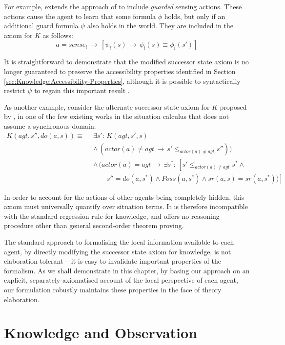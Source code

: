 For example, \citet{Petrick06thesis} extends the approach of \citep{scherl03sc_knowledge}
to include \emph{guarded} sensing actions. These actions cause the
agent to learn that some formula $\phi$ holds, but only if an additional
guard formula $\psi$ also holds in the world. They are included in
the axiom for $K$ as follows:\[
a=sense_{i}\,\rightarrow\,\left[\psi_{i}(s)\,\rightarrow\,\phi_{i}(s)\equiv\phi_{i}(s')\right]\]


It is straightforward to demonstrate that the modified successor state
axiom is no longer guaranteed to preserve the accessibility properties
identified in Section \eqref{sec:Knowledge:Accessibility-Properties},
although it is possible to syntactically restrict $\psi$ to regain
this important result \citep{Petrick06thesis}.

As another example, consider the alternate successor state axiom for
$K$ proposed by \citet{Lesperance99sitcalc_approach}, in one of
the few existing works in the situation calculus that does not assume
a synchronous domain:\begin{align*}
K(agt,s'',do(a,s))\equiv\,\,\, & \exists s':\, K(agt,s',s)\\
 & \wedge\,(actor(a)\neq agt\,\rightarrow\, s'\leq_{actor(a)\neq agt}s''))\\
 & \wedge\,(actor(a)=agt\,\rightarrow\,\exists s^{*}:\,\left[s'\leq_{actor(a)\neq agt}s^{*}\wedge\right.\\
 & \,\,\,\,\,\,\,\,\,\,\,\,\left.s''=do(a,s^{*})\wedge Poss(a,s^{*})\wedge sr(a,s)=sr(a,s^{*}))\right]\end{align*}


In order to account for the actions of other agents being completely
hidden, this axiom must universally quantify over situation terms.
It is therefore incompatible with the standard regression rule for
knowledge, and \citep{Lesperance99sitcalc_approach} offers no reasoning
procedure other than general second-order theorem proving.

The standard approach to formalising the local information available
to each agent, by directly modifying the successor state axiom for
knowledge, is not elaboration tolerant -- it is easy to invalidate
important properties of the formalism. As we shall demonstrate in
this chapter, by basing our approach on an explicit, separately-axiomatised
account of the local perspective of each agent, our formulation robustly
maintains these properties in the face of theory elaboration.


\section{Knowledge and Observation\label{sec:Knowledge:Observation}}

